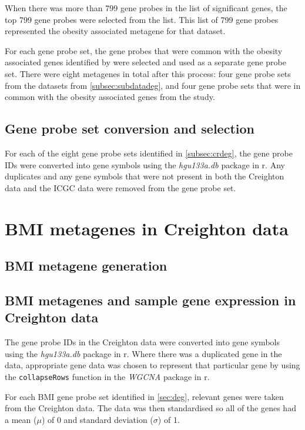 When there was more than 799 gene probes in the list of significant genes, the top 799 gene probes were selected from the list.
This list of 799 gene probes represented the obesity associated metagene for that dataset.

For each gene probe set, the gene probes that were common with the obesity associated genes identified by \citet{Creighton2012} were selected and used as a separate gene probe set.
There were eight metagenes in total after this process: four gene probe sets from the datasets from \cref{subsec:subdatadeg}, and four gene probe sets that were in common with the obesity associated genes from the \citet{Creighton2012} study.

\subsection{Gene probe set conversion and selection}
\label{subsec:gpconv}

For each of the eight gene probe sets identified in \cref{subsec:crdeg}, the gene probe IDs were converted into gene symbols using the \textit{hgu133a.db} package in \gls{r}.
Any duplicates and any gene symbols that were not present in both the Creighton data and the ICGC data were removed from the gene probe set.

\section{BMI metagenes in Creighton data}
\label{sec:bmidegmetacr}

\subsection{BMI metagene generation}
\label{subsec:bmimetagen}




\subsection{BMI metagenes and sample gene expression in Creighton data}
\label{subsec:gpconv}

The gene probe IDs in the Creighton data were converted into gene symbols using the \textit{hgu133a.db} package in \gls{r}.
Where there was a duplicated gene in the data, appropriate gene data was chosen to represent that particular gene by using the \texttt{collapseRows} function in the \textit{WGCNA} package in \gls{r}.

For each BMI gene probe set identified in \cref{sec:deg}, relevant genes were taken from the Creighton data.
The data was then standardised so all of the genes had a mean ($\mu$) of 0 and standard deviation ($\sigma$) of 1.






